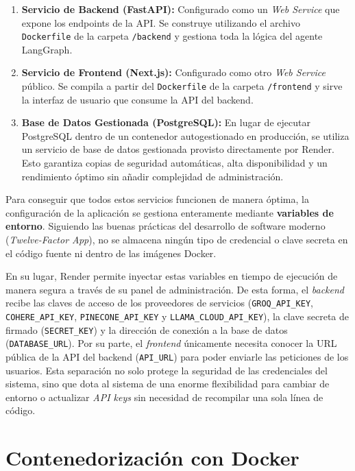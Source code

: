 \documentclass[12pt,a4paper,oneside]{report}
\begin{document}
\begin{enumerate}
    \item \textbf{Servicio de Backend (FastAPI):} Configurado como un \textit{Web Service} que expone los endpoints de la API. Se construye utilizando el archivo \texttt{Dockerfile} de la carpeta \texttt{/backend} y gestiona toda la lógica del agente LangGraph.
    
    \item \textbf{Servicio de Frontend (Next.js):} Configurado como otro \textit{Web Service} público. Se compila a partir del \texttt{Dockerfile} de la carpeta \texttt{/frontend} y sirve la interfaz de usuario que consume la API del backend.
    
    \item \textbf{Base de Datos Gestionada (PostgreSQL):} En lugar de ejecutar PostgreSQL dentro de un contenedor autogestionado en producción, se utiliza un servicio de base de datos gestionada provisto directamente por Render. Esto garantiza copias de seguridad automáticas, alta disponibilidad y un rendimiento óptimo sin añadir complejidad de administración.
\end{enumerate}

Para conseguir que todos estos servicios funcionen de manera óptima, la configuración de la aplicación se gestiona enteramente mediante \textbf{variables de entorno}. Siguiendo las buenas prácticas del desarrollo de software moderno (\textit{Twelve-Factor App}), no se almacena ningún tipo de credencial o clave secreta en el código fuente ni dentro de las imágenes Docker.

En su lugar, Render permite inyectar estas variables en tiempo de ejecución de manera segura a través de su panel de administración. De esta forma, el \textit{backend} recibe las claves de acceso de los proveedores de servicios (\texttt{GROQ\_API\_KEY}, \texttt{COHERE\_API\_KEY}, \texttt{PINECONE\_API\_KEY} y \texttt{LLAMA\_CLOUD\_API\_KEY}), la clave secreta de firmado (\texttt{SECRET\_KEY}) y la dirección de conexión a la base de datos (\texttt{DATABASE\_URL}). Por su parte, el \textit{frontend} únicamente necesita conocer la URL pública de la API del backend (\texttt{API\_URL}) para poder enviarle las peticiones de los usuarios. Esta separación no solo protege la seguridad de las credenciales del sistema, sino que dota al sistema de una enorme flexibilidad para cambiar de entorno o actualizar \textit{API keys} sin necesidad de recompilar una sola línea de código.
\section{Contenedorización con Docker}
\end{document}
